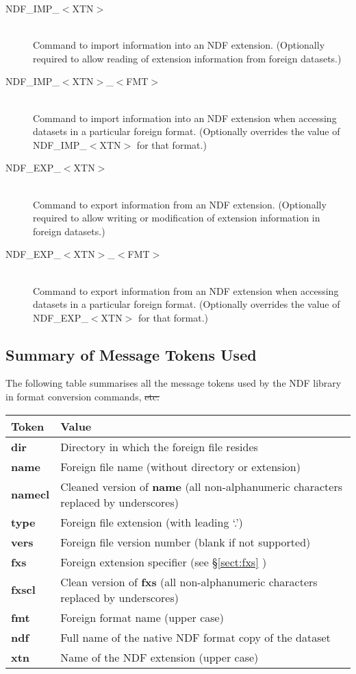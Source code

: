 \begin{description}
\item[NDF\_IMP\_$<$XTN$>$]\mbox{}\\
Command to import information into an NDF extension. (Optionally
required to allow reading of extension information from foreign
datasets.)

\item[NDF\_IMP\_$<$XTN$>$\_$<$FMT$>$]\mbox{}\\
Command to import information into an NDF extension when accessing
datasets in a particular foreign format. (Optionally overrides the
value of NDF\_IMP\_$<$XTN$>$ for that format.)

\item[NDF\_EXP\_$<$XTN$>$]\mbox{}\\
Command to export information from an NDF extension. (Optionally
required to allow writing or modification of extension information in
foreign datasets.)

\item[NDF\_EXP\_$<$XTN$>$\_$<$FMT$>$]\mbox{}\\
Command to export information from an NDF extension when accessing
datasets in a particular foreign format. (Optionally overrides the
value of NDF\_EXP\_$<$XTN$>$ for that format.)

\end{description}

\subsection{Summary of Message Tokens Used}

The following table summarises all the message tokens used by the NDF
library in format conversion commands, \st{etc:}

\begin{center}
\begin{tabular}{|l|l|}
\hline
{\bf Token} & {\bf Value}\\
\hline\hline
{\bf dir}  & Directory in which the foreign file resides\\
{\bf name} & Foreign file name (without directory or extension)\\
{\bf namecl} & Cleaned version of {\bf name} (all non-alphanumeric characters
replaced by underscores)\\
{\bf type} & Foreign file extension (with leading `.')\\
{\bf vers} & Foreign file version number (blank if not supported)\\
{\bf fxs}  & Foreign extension specifier (see \S\ref{sect:fxs} )\\
{\bf fxscl} & Clean version of {\bf fxs} (all non-alphanumeric characters
replaced by underscores)\\
{\bf fmt}  & Foreign format name (upper case)\\
{\bf ndf}  & Full name of the native NDF format copy of the dataset\\
{\bf xtn}  & Name of the NDF extension (upper case)\\
\hline
\end{tabular}
\end{center}

